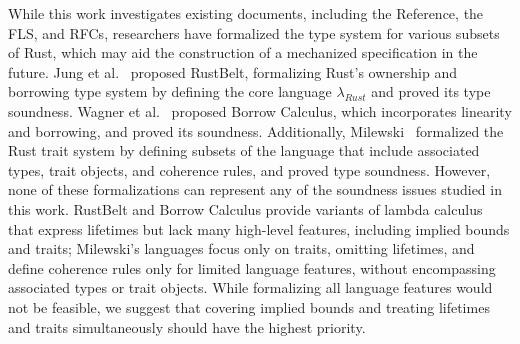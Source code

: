 While this work investigates existing documents, including the Reference, the
FLS, and RFCs, researchers have formalized the type system for various subsets
of Rust, which may aid the construction of a mechanized specification in the
future.
%
Jung et al.~\cite{jung2017rustbelt} proposed RustBelt, formalizing Rust's
ownership and borrowing type system by defining the core language
$\lambda_{Rust}$ and proved its type soundness.
%
Wagner et al.~\cite{wagner2025linearity} proposed Borrow Calculus, which
incorporates linearity and borrowing, and proved its soundness.
%
Additionally, Milewski~\cite{milewski2015traits} formalized the Rust trait
system by defining subsets of the language that include associated types, trait
objects, and coherence rules, and proved type soundness.
%
However, none of these formalizations can represent any of the soundness issues
studied in this work.
%
RustBelt and Borrow Calculus provide variants of lambda calculus that express
lifetimes but lack many high-level features, including implied bounds and
traits;
%
Milewski's languages focus only on traits, omitting lifetimes, and define
coherence rules only for limited language features, without encompassing
associated types or trait objects.
%
While formalizing all language features would not be feasible, we suggest that
covering implied bounds and treating lifetimes and traits simultaneously should
have the highest priority.





